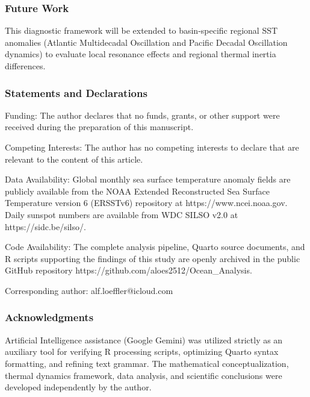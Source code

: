 \documentclass[
  letterpaper,
  DIV=11,
  numbers=noendperiod]{scrartcl}
\begin{document}
\subsubsection{Future Work}\label{future-work}

This diagnostic framework will be extended to basin-specific regional
SST anomalies (Atlantic Multidecadal Oscillation and Pacific Decadal
Oscillation dynamics) to evaluate local resonance effects and regional
thermal inertia differences.

\subsubsection{Statements and
Declarations}\label{statements-and-declarations}

Funding: The author declares that no funds, grants, or other support
were received during the preparation of this manuscript.

Competing Interests: The author has no competing interests to declare
that are relevant to the content of this article.

Data Availability: Global monthly sea surface temperature anomaly fields
are publicly available from the NOAA Extended Reconstructed Sea Surface
Temperature version 6 (ERSSTv6) repository at https://www.ncei.noaa.gov.
Daily sunspot numbers are available from WDC SILSO v2.0 at
https://sidc.be/silso/.

Code Availability: The complete analysis pipeline, Quarto source
documents, and R scripts supporting the findings of this study are
openly archived in the public GitHub repository
https://github.com/aloes2512/Ocean\_Analysis.

Corresponding author: alf.loeffler@icloud.com

\subsubsection{Acknowledgments}\label{acknowledgments}

Artificial Intelligence assistance (Google Gemini) was utilized strictly
as an auxiliary tool for verifying R processing scripts, optimizing
Quarto syntax formatting, and refining text grammar. The mathematical
conceptualization, thermal dynamics framework, data analysis, and
scientific conclusions were developed independently by the author.
\end{document}
